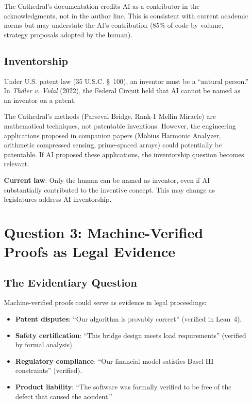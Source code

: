 \documentclass[11pt,a4paper]{article}
\begin{document}
The Cathedral's documentation credits AI as a contributor in the
acknowledgments, not in the author line. This is consistent with
current academic norms but may understate the AI's contribution
(85\% of code by volume, strategy proposals adopted by the human).

\subsection{Inventorship}

Under U.S. patent law (35 U.S.C. \S~100), an inventor must be a
``natural person.'' In \emph{Th\'aler v. Vidal} (2022), the
Federal Circuit held that AI cannot be named as an inventor on a
patent.

The Cathedral's methods (Parseval Bridge, Rank-1 Mellin Miracle)
are mathematical techniques, not patentable inventions. However,
the engineering applications proposed in companion papers (M\"obius
Harmonic Analyzer, arithmetic compressed sensing, prime-spaced
arrays) could potentially be patentable. If AI proposed these
applications, the inventorship question becomes relevant.

\textbf{Current law}: Only the human can be named as inventor,
even if AI substantially contributed to the inventive concept.
This may change as legislatures address AI inventorship.

\section{Question 3: Machine-Verified Proofs as Legal Evidence}
\label{sec:evidence}

\subsection{The Evidentiary Question}

Machine-verified proofs could serve as evidence in legal
proceedings:

\begin{itemize}
  \item \textbf{Patent disputes}: ``Our algorithm is provably
    correct'' (verified in Lean~4).
  \item \textbf{Safety certification}: ``This bridge design
    meets load requirements'' (verified by formal analysis).
  \item \textbf{Regulatory compliance}: ``Our financial model
    satisfies Basel III constraints'' (verified).
  \item \textbf{Product liability}: ``The software was formally
    verified to be free of the defect that caused the accident.''
\end{itemize}
\end{document}
